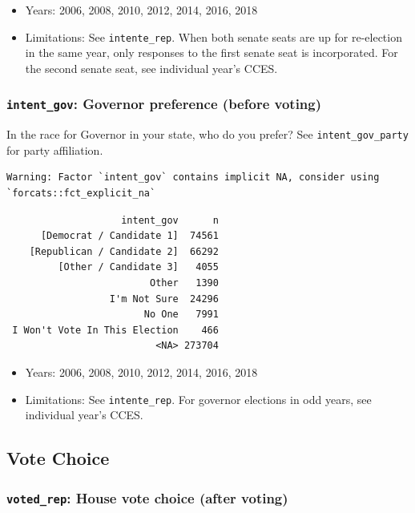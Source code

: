 \documentclass[10pt,article,oneside]{memoir}
\theoremstyle{definition}
\begin{document}
\begin{itemize}
\tightlist
\item
  Years: 2006, 2008, 2010, 2012, 2014, 2016, 2018
\item
  Limitations: See \texttt{intente\_rep}. When both senate seats are up
  for re-election in the same year, only responses to the first senate
  seat is incorporated. For the second senate seat, see individual
  year's CCES.
\end{itemize}

\hypertarget{intent_gov-governor-preference-before-voting}{%
\subsubsection{\texorpdfstring{\texttt{intent\_gov}: Governor preference
(before
voting)}{intent\_gov: Governor preference (before voting)}}\label{intent_gov-governor-preference-before-voting}}

In the race for Governor in your state, who do you prefer? See
\texttt{intent\_gov\_party} for party affiliation.

\begin{verbatim}
Warning: Factor `intent_gov` contains implicit NA, consider using
`forcats::fct_explicit_na`
\end{verbatim}

\begin{verbatim}
                    intent_gov      n
      [Democrat / Candidate 1]  74561
    [Republican / Candidate 2]  66292
         [Other / Candidate 3]   4055
                         Other   1390
                  I'm Not Sure  24296
                        No One   7991
 I Won't Vote In This Election    466
                          <NA> 273704
\end{verbatim}

\begin{itemize}
\tightlist
\item
  Years: 2006, 2008, 2010, 2012, 2014, 2016, 2018
\item
  Limitations: See \texttt{intente\_rep}. For governor elections in odd
  years, see individual year's CCES.
\end{itemize}

\hypertarget{vote-choice}{%
\subsection{Vote Choice}\label{vote-choice}}

\hypertarget{voted_rep-house-vote-choice-after-voting}{%
\subsubsection{\texorpdfstring{\texttt{voted\_rep}: House vote choice
(after
voting)}{voted\_rep: House vote choice (after voting)}}\label{voted_rep-house-vote-choice-after-voting}}
\end{document}
